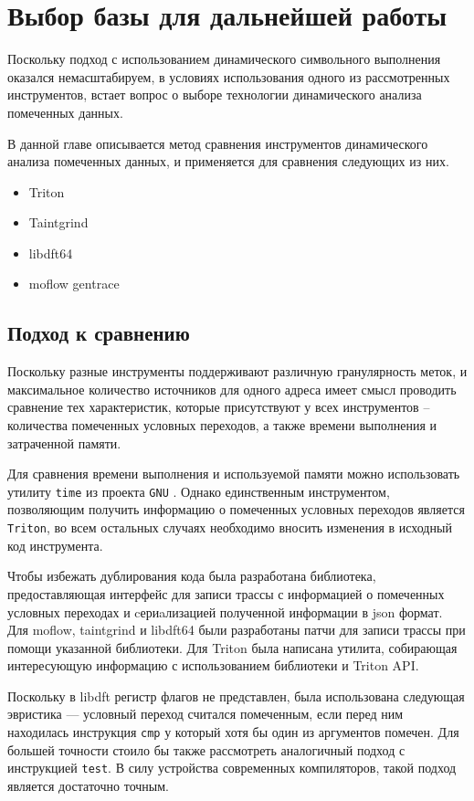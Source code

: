 \chapter{Выбор базы для дальнейшей работы}

Поскольку подход с использованием динамического символьного выполнения оказался немасштабируем, в условиях использования одного из рассмотренных инструментов, встает вопрос о выборе технологии динамического анализа помеченных данных.

В данной главе описывается метод сравнения инструментов динамического анализа помеченных данных, и применяется для сравнения следующих из них.

\begin{itemize}
    \item Triton
    \item Taintgrind
    \item libdft64
    \item moflow gentrace
\end{itemize}

\section{Подход к сравнению}

Поскольку разные инструменты поддерживают различную гранулярность меток, и максимальное количество источников для одного адреса имеет смысл проводить сравнение тех характеристик, которые присутствуют у всех инструментов -- количества помеченных условных переходов, а также времени выполнения и затраченной памяти.

Для сравнения времени выполнения и используемой памяти можно использовать утилиту \texttt{time} из проекта \texttt{GNU} \cite{TIME}. Однако единственным инструментом, позволяющим получить информацию о помеченных условных переходов является \texttt{Triton}, во всем остальных случаях необходимо вносить изменения в исходный код инструмента. 

Чтобы избежать дублирования кода была разработана библиотека, предоставляющая интерфейс для записи трассы с информацией о помеченных условных переходах и cериaлизацией полученной информации в json формат. Для moflow, taintgrind и libdft64 были разработаны патчи для записи трассы при помощи указанной библиотеки. Для Triton была написана утилита, собирающая интересующую информацию с использованием библиотеки и Triton API.

Поскольку в libdft регистр флагов не представлен, была использована следующая эвристика --- условный переход считался помеченным, если перед ним находилась инструкция \texttt{cmp} у который хотя бы один из аргументов помечен. Для большей точности стоило бы также рассмотреть аналогичный подход с инструкцией \texttt{test}. В силу устройства современных компиляторов, такой подход является достаточно точным.

